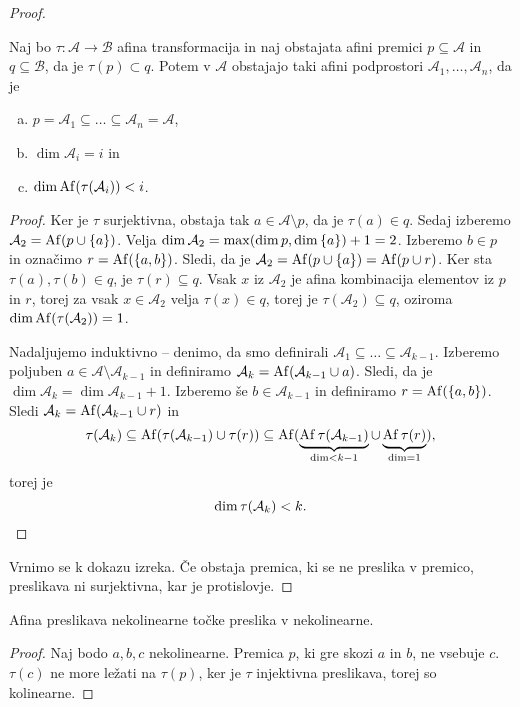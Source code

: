 \begin{proof}
\begin{lema*}
    Naj bo $\tau \colon \mathcal{A} \to \mathcal{B}$ afina transformacija in naj obstajata afini premici $p \subseteq \mathcal{A}$ in $q \subseteq \mathcal{B}$, da je $\tau (p) \subset q$. Potem v $\mathcal{A}$ obstajajo taki afini podprostori $\mathcal{A}_1, \dots, \mathcal{A}_n$, da je
    \begin{enumerate}[a)]
        \item $p = \mathcal{A}_1 \subseteq \dots \subseteq \mathcal{A}_n = \mathcal{A}$,
        \item $\dim \mathcal{A}_i = i$ in
        \item $\dim \operatorname{Af} (\tau(\mathcal{A}_i)) < i$.
    \end{enumerate}
\end{lema*}

\begin{proof}
    Ker je $\tau$ surjektivna, obstaja tak $a \in \mathcal{A} \setminus p$, da je $\tau (a) \in q$. Sedaj izberemo $\mathcal{A}_2 = \operatorname{Af} (p \cup \left\{a\right\})$.
    Velja $\dim \mathcal{A}_2 = \max(\dim p, \dim\left\{a\right\}) + 1 = 2$. Izberemo $b \in p$ in označimo $r = \operatorname{Af} (\left\{a,b\right\})$.
    Sledi, da je $\mathcal{A}_2 = \operatorname{Af} (p \cup \left\{a\right\}) = \operatorname{Af} (p \cup r)$. Ker sta $\tau (a), \tau (b) \in q$, je $\tau (r) \subseteq q$. Vsak $x$ iz $\mathcal{A}_2$ je afina kombinacija elementov iz $p$ in $r$,
    torej za vsak $x \in \mathcal{A}_2$ velja $\tau (x) \in q$, torej je $\tau (\mathcal{A}_2) \subseteq q$, oziroma $\dim \operatorname{Af} (\tau (\mathcal{A}_2)) = 1$.

    Nadaljujemo induktivno -- denimo, da smo definirali $\mathcal{A}_1 \subseteq \dots \subseteq \mathcal{A}_{k-1}$. Izberemo poljuben $a \in \mathcal{A} \setminus \mathcal{A}_{k-1}$ in definiramo $\mathcal{A}_k = \operatorname{Af} (\mathcal{A}_{k-1} \cup {a})$.
    Sledi, da je $\dim \mathcal{A}_k = \dim \mathcal{A}_{k-1} + 1$. Izberemo še $b \in \mathcal{A}_{k-1}$ in definiramo $r = \operatorname{Af} (\left\{a,b\right\})$. Sledi $\mathcal{A}_k = \operatorname{Af} (\mathcal{A}_{k-1} \cup r)$ in
    \[
        \tau (\mathcal{A}_k) \subseteq \operatorname{Af} (\tau (\mathcal{A}_{k-1}) \cup \tau (r)) \subseteq \operatorname{Af} (\underbrace{\operatorname{Af} \tau (\mathcal{A}_{k-1})}_{{\dim} < k - 1} \cup \underbrace{\operatorname{Af} \tau (r)}_{{\dim} = 1}),
    \] torej je
    \[
      \dim \tau (\mathcal{A}_k) < k. \qedhere  
    \]
\end{proof}

	Vrnimo se k dokazu izreka. Če obstaja premica, ki se ne preslika v premico, preslikava ni surjektivna, kar je protislovje.
\end{proof}

\begin{posledica}
    Afina preslikava nekolinearne točke preslika v nekolinearne.
\end{posledica}

\begin{proof}
    Naj bodo $a,b,c$ nekolinearne. Premica $p$, ki gre skozi $a$ in $b$, ne vsebuje $c$. $\tau (c)$ ne more ležati na $\tau (p)$, ker je $\tau$ injektivna preslikava, torej so kolinearne.
\end{proof}
